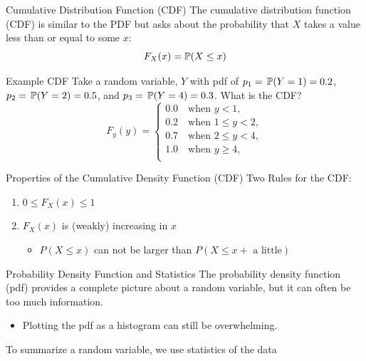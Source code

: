 \documentclass[aspectratio=169,t,11pt,table]{beamer}
\begin{document}
\begin{frame}{Cumulative Distribution Function (CDF)}
  The cumulative distribution function (CDF) is similar to the PDF but asks about the probability that $X$ takes a value less than or equal to some $x$:
  \[
    F_{X}(x) = \P(X \leq x)
  \]
\end{frame}

\begin{frame}{Example CDF}
  Take a random variable, $Y$ with pdf of $p_1 = \P{Y = 1} = 0.2$, $p_2 = \P{Y = 2} = 0.5$, and $p_3 = \P{Y = 4} = 0.3$. 
  What is the CDF? \pause
  $$
    F_{y}(y) = \begin{cases}
      0.0   \quad \text{when } y < 1, \\
      0.2 \quad \text{when } 1 \leq y < 2, \\
      0.7 \quad \text{when } 2 \leq y < 4, \\
      1.0   \quad \text{when } y \geq 4, \\
    \end{cases}
  $$
\end{frame}

\begin{frame}{Properties of the Cumulative Density Function (CDF)}
  Two Rules for the CDF:
  \begin{enumerate}
    \item $0 \leq F_{X}(x) \leq 1$
    
    \pause
    \item $F_{X}(x)$ is (weakly) increasing in $x$
    \begin{itemize}
      \item $P(X \leq x)$ can not be larger than $P(X \leq x + \text{ a little})$
    \end{itemize}
  \end{enumerate}
\end{frame}

\begin{frame}{Probability Density Function and Statistics}
  The probability density function (pdf) provides a complete picture about a random variable, but it can often be too much information.
  \begin{itemize}
    \item Plotting the pdf as a histogram can still be overwhelming.
  \end{itemize}
  
  \pause
  \bigskip
  To summarize a random variable, we use \alert{statistics} of the data
\end{frame}
\end{document}
